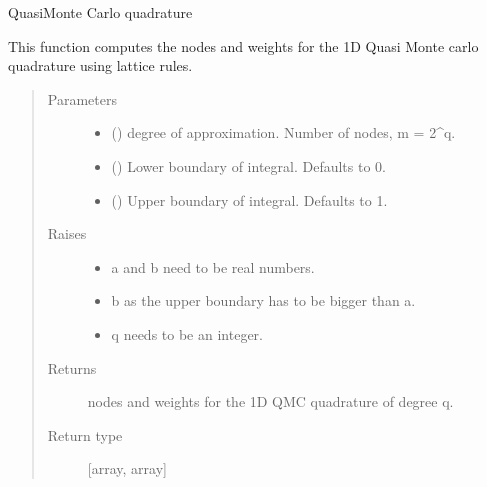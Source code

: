 \documentclass[letterpaper,10pt,english]{sphinxmanual}
\begin{document}
\begin{fulllineitems}
\label{\detokenize{index:Studienprojekt_Smolyak_qmc_one_point.qmc_quad}}
Quasi\sphinxhyphen{}Monte Carlo quadrature

This function computes the nodes and weights for the 1D Quasi Monte carlo quadrature using lattice rules.
\begin{quote}\begin{description}
\item[{Parameters}] \leavevmode\begin{itemize}
\item {} 
 () \textendash{} degree of approximation. Number of nodes, m = 2\textasciicircum{}q.

\item {} 
 (\sphinxstyleliteralemphasis{\sphinxupquote{, }}) \textendash{} Lower boundary of integral. Defaults to 0.

\item {} 
 (\sphinxstyleliteralemphasis{\sphinxupquote{, }}) \textendash{} Upper boundary of integral. Defaults to 1.

\end{itemize}

\item[{Raises}] \leavevmode\begin{itemize}
\item {} 
 \textendash{} a and b need to be real numbers.

\item {} 
 \textendash{} b as the upper boundary has to be bigger than a.

\item {} 
 \textendash{} q needs to be an integer.

\end{itemize}

\item[{Returns}] \leavevmode
nodes and weights for the 1D QMC quadrature of degree q.

\item[{Return type}] \leavevmode
{[}array, array{]}

\end{description}\end{quote}

\end{fulllineitems}
\end{document}
